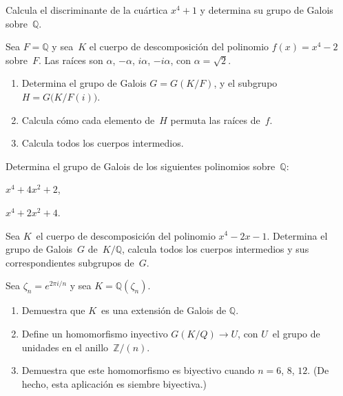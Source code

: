 \documentclass[12pt]{article}
\begin{document}
    
    \begin{exercise}[16.9.6]
        Calcula el discriminante de la cuártica $x^{4}+1$ y determina su grupo de Galois sobre~$\mathbb{Q}$.
    \end{exercise}
    
    \begin{exercise}[16.9.11]
        Sea $F=\mathbb{Q}$ y sea~$K$ el cuerpo de descomposición del polinomio $f(x)=x^{4}-2$ sobre~$F$. Las raíces son $\alpha$, $-\alpha$, $i \alpha$, $-i \alpha$, con $\alpha=\sqrt{2}$.
        \begin{enumerate}[\bfseries(a)]
            \item Determina el grupo de Galois $G=G(K/F)$, y el subgrupo $H=G\bigl(K/F(i)\bigr)$.
            \item Calcula cómo cada elemento de~$H$ permuta las raíces de~$f$.
            \item Calcula todos los cuerpos intermedios.
        \end{enumerate}
    \end{exercise}
    
    \begin{exercise}[16.9.12]
        Determina el grupo de Galois de los siguientes polinomios sobre~$\mathbb{Q}$:
        
        \noindent
        \begin{inparaenum}[\bfseries(a)]
            \item $x^{4}+4x^{2}+2$,
            \item $x^{4}+2x^{2}+4$.
        \end{inparaenum}
    \end{exercise}
    
    \begin{exercise}[16.9.13]
        Sea $K$~el cuerpo de descomposición del polinomio $x^{4}-2x-1$. Determina el grupo de Galois~$G$ de~$K/\mathbb{Q}$, calcula todos los cuerpos intermedios y sus correspondientes subgrupos de~$G$. 
    \end{exercise}
    
    
    \begin{exercise}[16.10.7]
        Sea $\zeta_{n}=e^{2\pi i/n}$ y sea $K=\mathbb{Q}(\zeta_{n})$.
        \begin{enumerate}[\bfseries(a)]
            \item Demuestra que $K$~es una extensión de Galois de $\mathbb{Q}$.
            \item Define un homomorfismo inyectivo $G(K/Q)\to U$, con $U$~el grupo de unidades en el anillo~$\mathbb{Z}/(n)$.
            \item Demuestra que este homomorfismo es biyectivo cuando $n=6$, $8$, $12$. (De hecho, esta aplicación es siembre biyectiva.)
        \end{enumerate}
    \end{exercise}
    
\end{document}
